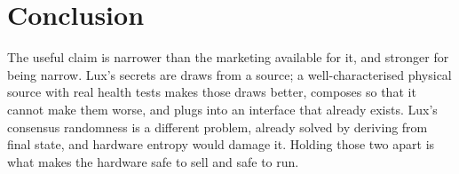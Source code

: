 \documentclass[11pt,a4paper]{article}
\begin{document}
\section{Conclusion}

The useful claim is narrower than the marketing available for it, and stronger
for being narrow. Lux's secrets are draws from a source; a well-characterised
physical source with real health tests makes those draws better, composes so
that it cannot make them worse, and plugs into an interface that already
exists. Lux's consensus randomness is a different problem, already solved by
deriving from final state, and hardware entropy would damage it. Holding those
two apart is what makes the hardware safe to sell and safe to run.
\end{document}
